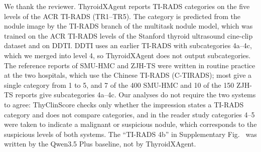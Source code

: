 We thank the reviewer. ThyroidXAgent reports TI-RADS categories on the five levels of the ACR TI-RADS (TR1--TR5). The category is predicted from the nodule image by the TI-RADS branch of the multitask nodule model, which was trained on the ACR TI-RADS levels of the Stanford thyroid ultrasound cine-clip dataset and on DDTI. DDTI uses an earlier TI-RADS with subcategories 4a--4c, which we merged into level 4, so ThyroidXAgent does not output subcategories. The reference reports of SMU-HMC and ZJH-TS were written in routine practice at the two hospitals, which use the Chinese TI-RADS (C-TIRADS); most give a single category from 1 to 5, and 7 of the 400 SMU-HMC and 10 of the 150 ZJH-TS reports give subcategories 4a--4c. Our analyses do not require the two systems to agree: ThyClinScore checks only whether the impression states a TI-RADS category and does not compare categories, and in the reader study categories 4--5 were taken to indicate a malignant or suspicious nodule, which corresponds to the suspicious levels of both systems. The ``TI-RADS 4b'' in Supplementary Fig.~\SuppFigCaseReview{} was written by the Qwen3.5 Plus baseline, not by ThyroidXAgent.\par

